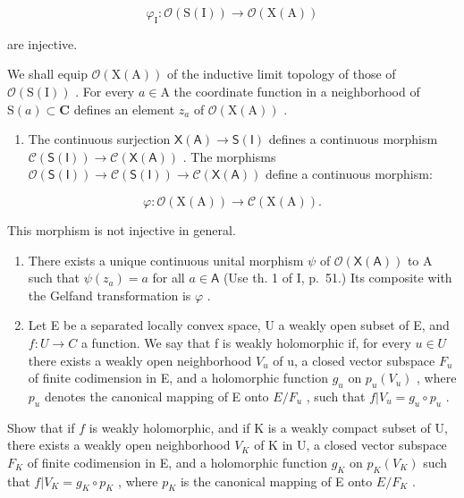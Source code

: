 \[
\varphi_ {\mathrm{I}} \colon \mathcal {O} (\mathrm{S} (\mathrm{I})) \longrightarrow \mathcal {O} (\mathrm{X} (\mathrm{A}))
\]

are injective.

We shall equip \(\mathcal{O}(\mathrm{X(A)})\) of the inductive limit topology of those of \(\mathcal{O}(\mathrm{S(I)})\) . For every \(a \in \mathrm{A}\) the coordinate function in a neighborhood of \(\mathrm{S}(a) \subset \mathbf{C}\) defines an element \(z_a\) of \(\mathcal{O}(\mathrm{X(A)})\) .

\begin{enumerate}
\def\labelenumi{\alph{enumi})}
\setcounter{enumi}{1}
\tightlist
\item
  The continuous surjection \(\mathsf{X}(\mathsf{A}) \to \mathsf{S}(\mathsf{I})\) defines a continuous morphism \(\mathcal{C}(\mathsf{S}(\mathsf{I})) \to \mathcal{C}(\mathsf{X}(\mathsf{A}))\) . The morphisms \(\mathcal{O}(\mathsf{S}(\mathsf{I})) \to \mathcal{C}(\mathsf{S}(\mathsf{I})) \to \mathcal{C}(\mathsf{X}(\mathsf{A}))\) define a continuous morphism:
\end{enumerate}

\[
\varphi \colon \mathcal {O} (\mathrm{X} (\mathrm{A})) \longrightarrow \mathcal {C} (\mathrm{X} (\mathrm{A})).
\]

This morphism is not injective in general.

\begin{enumerate}
\def\labelenumi{\alph{enumi})}
\setcounter{enumi}{2}
\item
  There exists a unique continuous unital morphism \(\psi\) of \(\mathcal{O}(\mathsf{X}(\mathsf{A}))\) to A such that \(\psi(z_a) = a\) for all \(a \in \mathsf{A}\) (Use th. 1 of I, p.~51.) Its composite with the Gelfand transformation is \(\varphi\) .
\item
  Let E be a separated locally convex space, U a weakly open subset of E, and \(f: U \to C\) a function. We say that f is weakly holomorphic if, for every \(u \in U\) there exists a weakly open neighborhood \(V_u\) of u, a closed vector subspace \(F_u\) of finite codimension in E, and a holomorphic function \(g_u\) on \(p_u(V_u)\) , where \(p_u\) denotes the canonical mapping of E onto \(E/F_u\) , such that \(f|V_u = g_u \circ p_u\) .
\end{enumerate}

Show that if \(f\) is weakly holomorphic, and if K is a weakly compact subset of U, there exists a weakly open neighborhood \(V_K\) of K in U, a closed vector subspace \(F_K\) of finite codimension in E, and a holomorphic function \(g_K\) on \(p_K(V_K)\) such that \(f|V_K = g_K \circ p_K\) , where \(p_K\) is the canonical mapping of E onto \(E/F_K\) .

